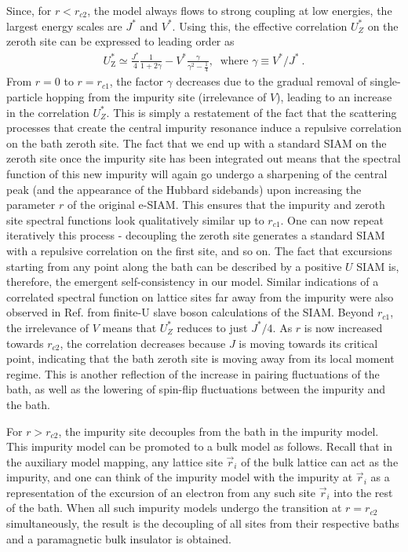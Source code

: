 Since, for \(r < r_{c2}\), the model always flows to strong coupling at low energies, the largest energy scales are \(J^*\) and \(V^*\). Using this, the effective correlation \(U_Z^*\) on the zeroth site can be expressed to leading order as
\begin{eqnarray}
	\label{new-imp-correlation}
	U_\text{Z}^* \simeq \frac{J^*}{4}\frac{1}{1 + 2\gamma} - V^* \frac{\gamma}{\gamma^2 - \frac{1}{4}},~ \text{ where }\gamma\equiv V^*/J^*~.
\end{eqnarray}
From \(r = 0\) to \(r = r_{c1}\), the factor \(\gamma\) decreases due to the gradual removal of single-particle hopping from the impurity site (irrelevance of \(V\)), leading to an increase in the correlation \(U_Z^*\). This is simply a restatement of the fact that the scattering processes that create the central impurity resonance induce a repulsive correlation on the bath zeroth site. The fact that we end up with a standard SIAM on the zeroth site once the impurity site has been integrated out means that the spectral function of this new impurity will again go undergo a sharpening of the central peak (and the appearance of the Hubbard sidebands) upon increasing the parameter $r$ of the original e-SIAM. This ensures that the impurity and zeroth site spectral functions look qualitatively similar up to \(r_{c1}\). One can now repeat iteratively this process - decoupling the zeroth site generates a standard SIAM with a repulsive correlation on the first site, and so on. The fact that excursions starting from any point along the bath can be described by a positive \(U\) SIAM is, therefore, the emergent self-consistency in our model. Similar indications of a correlated spectral function on lattice sites far away from the impurity were also observed in Ref.\cite{martin2019} from finite-U slave boson calculations of the SIAM. Beyond \(r_{c1}\), the irrelevance of \(V\) means that \(U_Z^*\) reduces to just \(J^*/4\). As \(r\) is now increased towards \(r_{c2}\), the correlation decreases because \(J\) is moving towards its critical point, indicating that the bath zeroth site is moving away from its local moment regime. This is another reflection of the increase in pairing fluctuations of the bath, as well as the lowering of spin-flip fluctuations between the impurity and the bath.

For \(r > r_{c2}\), the impurity site decouples from the bath in the impurity model. This impurity model can be promoted to a bulk model as follows. Recall that in the auxiliary model mapping, any lattice site \(\vec r_i\) of the bulk lattice can act as the impurity, and one can think of the impurity model with the impurity at \(\vec r_i\) as a representation of the excursion of an electron from any such site \(\vec r_i\) into the rest of the bath. When all such impurity models undergo the transition at \(r = r_{c2}\) simultaneously, the result is the decoupling of all sites from their respective baths and a paramagnetic bulk insulator is obtained.

